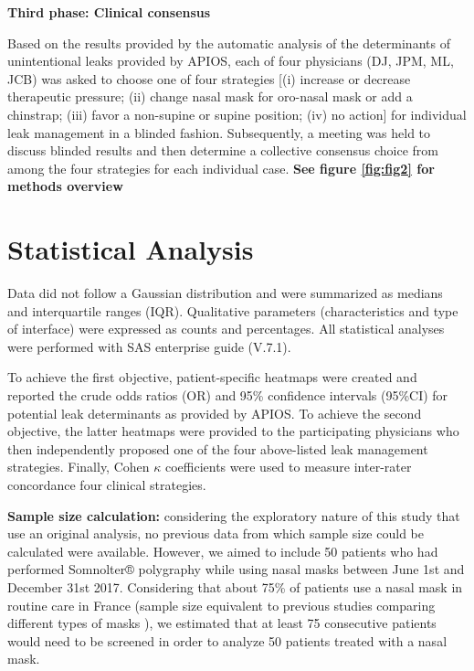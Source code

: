 \medbreak

\textbf{Third phase: Clinical consensus}

Based on the results provided by the automatic analysis of the determinants of unintentional leaks provided by APIOS, each of four physicians (DJ, JPM, ML, JCB) was asked to choose one of four strategies [(i)	increase or decrease therapeutic pressure; (ii) change nasal mask for oro-nasal mask or add a chinstrap; (iii) favor a non-supine or supine position; (iv) no action] for individual leak management in a blinded fashion. Subsequently, a meeting was held to discuss blinded results and then determine a collective consensus choice from among the four strategies for each individual case. \textbf{See figure \ref{fig:fig2} for methods overview}

\section{Statistical Analysis} 
\textbf{}
\hspace{\par}
Data did not follow a Gaussian distribution and were summarized as medians and interquartile ranges (IQR). Qualitative parameters (characteristics and type of interface) were expressed as counts and percentages. All statistical analyses were performed with SAS enterprise guide (V.7.1).

To achieve the first objective, patient-specific heatmaps were created and reported the crude odds ratios (OR) and 95\% confidence intervals (95\%CI) for potential leak determinants as provided by APIOS. To achieve the second objective, the latter heatmaps were provided to the participating physicians who then independently proposed one of the four above-listed leak management strategies. Finally, Cohen $\kappa$ coefficients were used to measure inter-rater concordance four clinical strategies. 

\textbf{Sample size calculation:} considering the exploratory nature of this study that use an original analysis, no previous data from which sample size could be calculated were available. However, we aimed to include 50 patients who had performed Somnolter® polygraphy while using nasal masks between June 1st and December 31st 2017. Considering that about 75\% of patients use a nasal mask in routine care in France (sample size equivalent to previous studies comparing different types of masks \citep{borel, lebret2018}), we estimated that at least 75 consecutive patients would need to be screened in order to analyze 50 patients treated with a nasal mask.


